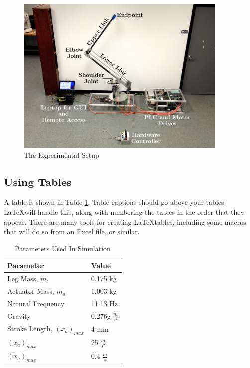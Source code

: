 \documentclass[11pt]{article}
\begin{document}
\begin{figure}[tbp]
\begin{center}
\includegraphics[width = 4in]{figures/Cherrypicker_labeled}
\caption{The Experimental Setup}
\label{fig:cherrypicker_labeled}
\end{center}
\vspace{-0.2in}
\end{figure}
%

\subsection{Using Tables}
\label{sec:tables}
\vspace{-0.2in}
%
A table is shown in Table \ref{table:sim_parameters}. Table captions should go above your tables. \LaTeX will handle this, along with numbering the tables in the order that they appear. There are many tools for creating \LaTeX tables, including some macros that will do so from an Excel file, or similar. 

\begin{table}
\label{table:sim_parameters}
\begin{center}
\caption{Parameters Used In Simulation}
\vspace{0.1in}
\begin{tabular}{ll}
\hline
\hline
Parameter & Value  \\
\hline
Leg Mass, $m_l$ & 0.175 kg \\
Actuator Mass, $m_a$ & 1.003 kg  \\
Natural Frequency & 11.13 Hz \\
Gravity  & 0.276g $\frac{m}{s^2}$ \\[1ex]
\hline
Stroke Length, $(x_a)_{max}$ & 4 mm \\
$(\ddot{x}_a)_{max}$ & 25 $\frac{m}{s^2}$ \\
$(\dot{x}_a)_{max}$ & 0.4 $\frac{m}{s}$ \\
\end{tabular}
\end{center}
\end{table}
\end{document}
